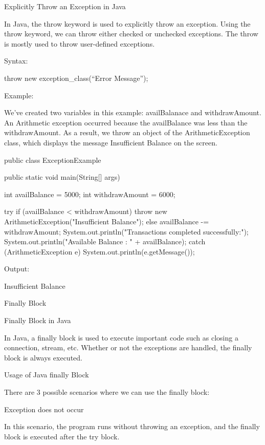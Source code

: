 { 

Explicitly Throw an Exception in Java
 

In Java, the throw keyword is used to explicitly throw an exception. Using the throw keyword, we can throw either checked or unchecked exceptions. The throw is mostly used to throw user-defined exceptions.


Syntax:
 

throw new exception_class(“Error Message”);
 

Example:
 

We've created two variables in this example: availBalanace and withdrawAmount. An Arithmetic exception occurred because the availBalance was less than the withdrawAmount. As a result, we throw an object of the ArithmeticException class, which displays the message Insufficient Balance on the screen.

 

public class ExceptionExample {

    public static void main(String[] args) {

        int availBalance = 5000;
        int withdrawAmount = 6000;

        try {
            if (availBalance < withdrawAmount) {
                throw new ArithmeticException("Insufficient Balance");
            } else {
                availBalance -= withdrawAmount;
                System.out.println("Transactions completed successfully:");
                System.out.println("Available Balance : " + availBalance);
            }
        } catch (ArithmeticException e) {
            System.out.println(e.getMessage());
        }
    }
}
 

Output:
 

Insufficient Balance


Finally Block
 

 

Finally Block in Java
 

In Java, a finally block is used to execute important code such as closing a connection, stream, etc. Whether or not the exceptions are handled, the finally block is always executed.


Usage of Java finally Block
 

There are 3 possible scenarios where we can use the finally block:

 

Exception does not occur
 

In this scenario, the program runs without throwing an exception, and the finally block is executed after the try block.

}
